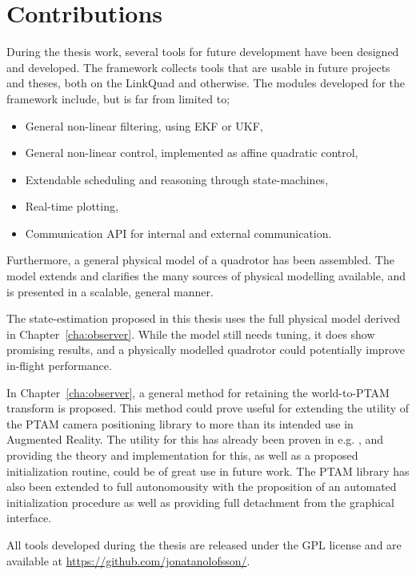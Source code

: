 \section{Contributions}
    During the thesis work, several tools for future development have been
    designed and developed. The \crap framework collects tools that are usable in future
    projects and theses, both on the LinkQuad and otherwise.
    The modules developed for the \crap framework include, but is far from limited to;
    \begin{itemize}
        \item General non-linear filtering, using EKF or UKF,
        \item General non-linear control, implemented as affine quadratic control,
        \item Extendable scheduling and reasoning through state-machines,
        \item Real-time plotting,
        \item Communication API for internal and external communication.
    \end{itemize}

    Furthermore, a general physical model of a quadrotor has been assembled.
    The model extends and clarifies the many sources of physical modelling
    available, and is presented in a scalable, general manner.

    The state-estimation proposed in this thesis uses the full physical model
    derived in Chapter~\ref{cha:observer}. While the model still needs
    tuning, it does show promising results, and a physically modelled
    quadrotor could potentially improve in-flight performance.

    In Chapter~\ref{cha:observer}, a general method for retaining
    the world-to-PTAM transform is proposed.
    This method could prove useful for extending the utility of the PTAM
    camera positioning library to more than its intended use in Augmented Reality.
    The utility for this has already been proven in e.g. \citep{weiss11monocular},
    and providing the theory and implementation for this, as well as a proposed
    initialization routine, could be of great use in future work.
    The PTAM library has also been extended to full autonomousity with the
    proposition of an automated initialization procedure as well as providing
    full detachment from the graphical interface.

    All tools developed during the thesis are released under the GPL license
    and are available at \url{https://github.com/jonatanolofsson/}.

